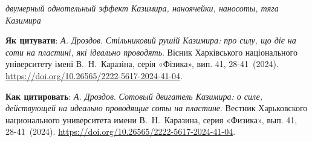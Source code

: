 \documentclass[twoside, 10pt]{article}
\def\myfirstpage{28}
\def\mylastpage{41}
\def\mypages{\myfirstpage-\mylastpage}
\def\myname{А. Дроздов}
\def\mynameukr{А. Дроздов}
\def\mytitle{Сотовый двигатель Казимира: о силе, действующей на идеально проводящие соты на пластине}
\def\mytitleukr{Стільниковий рушій Казимира: про силу, що діє на соти на пластині, які ідеально проводять}
\def\mydoi{10.26565/2222-5617-2024-41-04}
\def\ukrvisnyk{Вісник Харківського національного університету імені В.~Н.~Каразіна, серія «Фізика», вип. 41, \mypages~(2024)}
\def\envisnyk{Вестник Харьковского национального университета имени В.~Н.~Каразина, серия «Физика», вып. 41, \mypages~(2024)}
\begin{document}
\vspace{5mm}

\noindent
\begin{keywords}
\textit{двумерный однотельный эффект Казимира, наноячейки, наносоты, тяга Казимира}
\end{keywords}

\vspace{5mm}

\selectfont

\noindent
\textbf{Як цитувати}: \textit{\mynameukr}. \textit{\mytitleukr}. {\ukrvisnyk}. \href{https://doi.org/\mydoi}{https://doi.org/\mydoi}.

\vspace{5mm}

\selectfont

\noindent
\textbf{Как цитировать}: \textit{\myname}. \textit{\mytitle}. {\envisnyk}. \href{https://doi.org/\mydoi}{https://doi.org/\mydoi}.

\vspace{5mm}

\newpage
\end{document}
